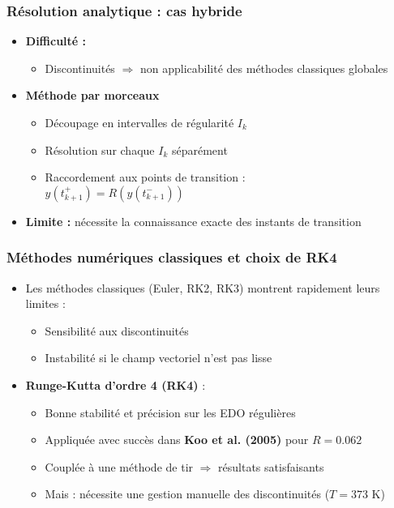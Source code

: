 \documentclass[handout]{beamer}
\newtheorem{pbm et hypo}[thm]{Problématique et hypothèses}
\begin{document}
	\begin{frame}
		\frametitle{Résolution analytique : cas hybride}
		\begin{itemize}
			\item[\maltese] \textbf{Difficulté :} 
			\begin{itemize}
				\item Discontinuités $\Rightarrow$ non applicabilité des méthodes classiques globales
			\end{itemize}
			
			\pause
			\item[\maltese] \textbf{Méthode par morceaux}
			\begin{itemize}
				\item Découpage en intervalles de régularité $I_k$
				\item Résolution sur chaque $I_k$ séparément
				\item Raccordement aux points de transition :\\
				$y(t_{k+1}^+) = R(y(t_{k+1}^-))$
			\end{itemize}
			
			\pause
			\item[\maltese] \textbf{Limite :} nécessite la connaissance exacte des instants de transition
		\end{itemize}
	\end{frame}
	
	\begin{frame}
		\frametitle{Méthodes numériques classiques et choix de RK4}
		\begin{itemize}
			\item[\maltese] Les méthodes classiques (Euler, RK2, RK3) montrent rapidement leurs limites :
			\begin{itemize}
				\item Sensibilité aux discontinuités
				\item Instabilité si le champ vectoriel n'est pas lisse
			\end{itemize}
			
			\pause
			\item[\maltese] \textbf{Runge-Kutta d'ordre 4 (RK4)} : 
			\begin{itemize}
				\item Bonne stabilité et précision sur les EDO régulières
				\item Appliquée avec succès dans \textbf{Koo et al. (2005)} pour $R = 0.062$
				\item Couplée à une méthode de tir $\Rightarrow$ résultats satisfaisants
				\item Mais : nécessite une gestion manuelle des discontinuités ($T = 373$ K)
			\end{itemize}
		\end{itemize}
	\end{frame}
	
\end{document}
